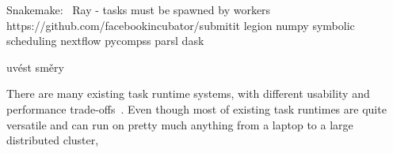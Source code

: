 Snakemake:~\cite{snakemake}
Ray - tasks must be spawned by workers
https://github.com/facebookincubator/submitit
legion numpy symbolic scheduling
nextflow
pycompss
parsl
dask

uvést směry

There are many existing task runtime systems, with different usability and performance
trade-offs~\cite{dask, nextflow, snakemake, pycompss, parsl, ray}. Even though most of existing
task runtimes are quite versatile and can run on pretty much anything from a laptop to a large
distributed cluster,
